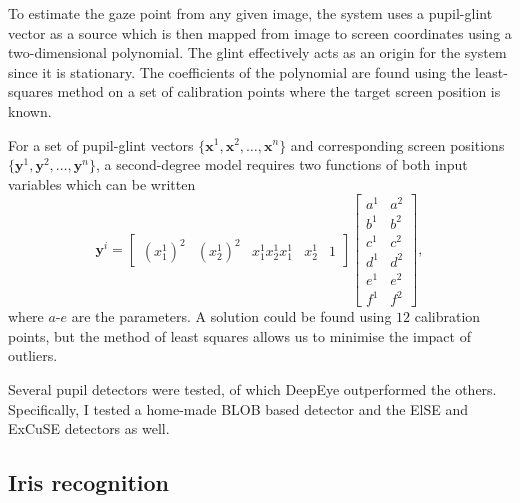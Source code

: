 To estimate the gaze point from any given image, the system uses a pupil-glint vector as a source which is then mapped from image to screen coordinates using a two-dimensional polynomial. The glint effectively acts as an origin for the system since it is stationary. The coefficients of the polynomial are found using the least-squares method on a set of calibration points where the target screen position is known.

For a set of pupil-glint vectors $\{\mathbf{x}^1, \mathbf{x}^2, \dots, \mathbf{x}^n\}$ and corresponding screen positions $\{\mathbf{y}^1, \mathbf{y}^2, \dots, \mathbf{y}^n\}$, a second-degree model requires two functions of both input variables which can be written
\begin{equation}
    \mathbf{y}^i =  \begin{bmatrix}
        \left(x_1^{1}\right)^2 & \left(x_2^{1}\right)^2 & x_1^1x_2^1 x_1^1 & x_2^1 & 1\end{bmatrix} \begin{bmatrix}a^1&a^2\\ b^1&b^2\\ c^1&c^2\\ d^1&d^2\\ e^1&e^2\\ f^1&f^2\end{bmatrix},
\end{equation}
where $a$-$e$ are the parameters. A solution could be found using $12$ calibration points, but the method of least squares allows us to minimise the impact of outliers.

Several pupil detectors were tested, of which DeepEye \parencite{vera2019deepeye} outperformed the others. Specifically, I tested a home-made BLOB based detector and the ElSE \parencite{fuhl2016else} and ExCuSE \parencite{excuse} detectors as well.

\subsection{Iris recognition}





